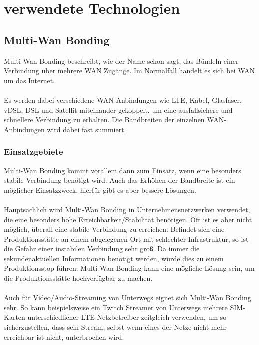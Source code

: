 \chapter{verwendete Technologien}
\label{chap:verwendeteTechnologien}
\section{Multi-Wan Bonding}
Multi-Wan Bonding beschreibt, wie der Name schon sagt, das Bündeln einer Verbindung über mehrere WAN Zugänge. Im Normalfall handelt es sich bei WAN um das Internet. 
\\\\
Es werden dabei verschiedene WAN-Anbindungen wie LTE, Kabel, Glasfaser, vDSL, DSL und Satellit miteinander gekoppelt, um eine ausfallsichere und schnellere Verbindung zu erhalten. Die Bandbreiten der einzelnen WAN-Anbindungen wird dabei fast summiert. 

\subsection{Einsatzgebiete}
Multi-Wan Bonding kommt vorallem dann zum Einsatz, wenn eine besonders stabile Verbindung benötigt wird. Auch das Erhöhen der Bandbreite ist ein möglicher Einsatzzweck, hierfür gibt es aber bessere Lösungen.
\\\\
Hauptsächlich wird Multi-Wan Bonding in Unternehmensnetzwerken verwendet, die eine besonders hohe Erreichbarkeit/Stabilität benötigen. Oft ist es aber nicht möglich, überall eine stabile Verbindung zu erreichen. Befindet sich eine Produktionsstätte an einem abgelegenen Ort mit schlechter Infrastruktur, so ist die Gefahr einer instabilen Verbindung sehr groß. Da immer die sekundenaktuellen Informationen benötigt werden, würde dies zu einem Produktionsstop führen. Multi-Wan Bonding kann eine mögliche Lösung sein, um die Produktionsstätte hochverfügbar zu machen.
\\\\
Auch für Video/Audio-Streaming von Unterwegs eignet sich Multi-Wan Bonding sehr. So kann beispielsweise ein Twitch Streamer von Unterwegs mehrere SIM-Karten unterschiedlicher LTE Netzbetreiber zeitgleich verwenden, um so sicherzustellen, dass sein Stream, selbst wenn eines der Netze nicht mehr erreichbar ist nicht, unterbrochen wird.
 
